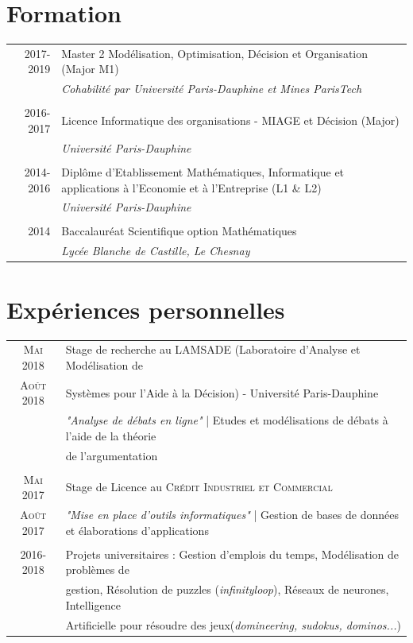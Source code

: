 \documentclass[a4paper,10pt]{article}
\begin{document}
\section{Formation}
\begin{tabular}{r|p{12.5cm}}
 \textsc{2017-2019} & Master 2 Modélisation, Optimisation, Décision et Organisation (Major M1)\\&\emph{\small{Cohabilité par Université Paris-Dauphine et Mines ParisTech}}\\\multicolumn{2}{c}{} \\
 \textsc{2016-2017} & Licence Informatique des organisations - MIAGE et Décision (Major)\\&\emph{\small{Université Paris-Dauphine}}\\\multicolumn{2}{c}{} \\
 \textsc{2014-2016} & Diplôme d'Etablissement Mathématiques, Informatique et applications à l'Economie et à l'Entreprise (L1 \& L2) \\&\emph{\small{Université Paris-Dauphine}}\\\multicolumn{2}{c}{} \\
 \textsc{2014} & Baccalauréat Scientifique option Mathématiques \\&\emph{\small{Lycée Blanche de Castille, Le Chesnay}}\\
\end{tabular}
\titlespacing{\section}{0pt}{2pt}{2pt}
\section{Expériences personnelles}
\begin{tabular}{cl}	
 \textsc{Mai} 2018 & Stage de recherche au \textsc{LAMSADE} (Laboratoire d'Analyse et Modélisation de\\ \textsc{Août} 2018 & Systèmes pour l'Aide à la Décision) - Université Paris-Dauphine\\
  & \emph{"Analyse de débats en ligne"}\small{ | Etudes et modélisations de débats à l'aide de la théorie }\\& \small{de l'argumentation}\\&\\
 \textsc{Mai} 2017 & Stage de Licence au \textsc{Crédit Industriel et Commercial}\\
 \textsc{Août} 2017 & \emph{"Mise en place d'outils informatiques"}\small{ | Gestion de bases de données et élaborations d'applications}\\&\\
 2016-2018 & Projets universitaires : Gestion d'emplois du temps, Modélisation de problèmes de\\& gestion, Résolution de puzzles (\emph{infinityloop}), Réseaux de neurones, Intelligence \\&Artificielle pour résoudre des jeux(\emph{domineering, sudokus, dominos...})
\end{tabular}
\end{document}
